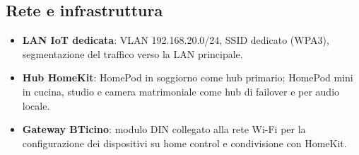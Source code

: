 \subsection{Rete e infrastruttura}
\begin{itemize}
  \item \textbf{LAN IoT dedicata}: VLAN 192.168.20.0/24, SSID dedicato (WPA3), segmentazione del traffico verso la LAN principale.
  \item \textbf{Hub HomeKit}: HomePod in soggiorno come hub primario; HomePod mini in cucina, studio e camera matrimoniale come hub di failover e per audio locale.
  \item \textbf{Gateway BTicino}: modulo DIN collegato alla rete Wi-Fi per la configurazione dei dispositivi su home control e condivisione con HomeKit.
\end{itemize}

